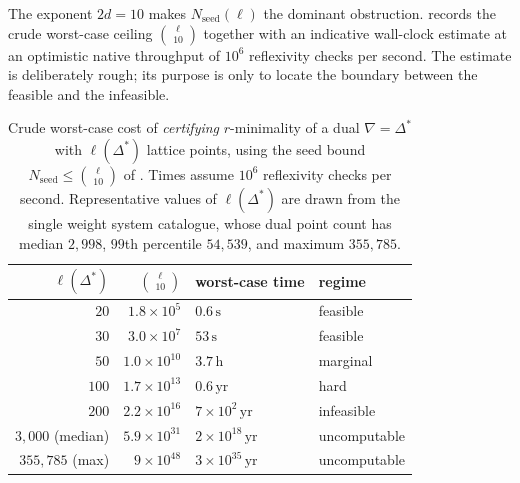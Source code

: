 \documentclass[appliedmath,article,submit,moreauthors]{Definitions/mdpi}
\begin{document}
The exponent \(2d=10\) makes \(N_{\mathrm{seed}}(\ell)\) the dominant
obstruction.  records the crude worst-case ceiling
\(\binom{\ell}{10}\) together with an indicative wall-clock estimate at an
optimistic native throughput of \(10^{6}\) reflexivity checks per second. The
estimate is deliberately rough; its purpose is only to locate the boundary
between the feasible and the infeasible.

\begin{table}[H]
\caption{Crude worst-case cost of \emph{certifying} \(r\)-minimality of a dual
\(\nabla=\Delta^*\) with \(\ell(\Delta^*)\) lattice points, using the seed bound
\(N_{\mathrm{seed}}\leq\binom{\ell}{10}\) of . Times assume
\(10^{6}\) reflexivity checks per second. Representative values of
\(\ell(\Delta^*)\) are drawn from the single weight system catalogue, whose dual
point count has median \(2{,}998\), \(99\)th percentile \(54{,}539\), and
maximum \(355{,}785\).\label{tab:rmin-cost}}
\begin{tabularx}{\textwidth}{RRLL}
\toprule
\(\ell(\Delta^*)\) & \(\binom{\ell}{10}\) & \textbf{worst-case time} & \textbf{regime} \\
\midrule
\(20\)      & \(1.8\times10^{5}\)  & \(0.6\,\mathrm{s}\)              & feasible \\
\(30\)      & \(3.0\times10^{7}\)  & \(53\,\mathrm{s}\)              & feasible \\
\(50\)      & \(1.0\times10^{10}\) & \(3.7\,\mathrm{h}\)            & marginal \\
\(100\)     & \(1.7\times10^{13}\) & \(0.6\,\mathrm{yr}\)           & hard \\
\(200\)     & \(2.2\times10^{16}\) & \(7\times10^{2}\,\mathrm{yr}\) & infeasible \\
\(3{,}000\) (median) & \(5.9\times10^{31}\) & \(2\times10^{18}\,\mathrm{yr}\) &
  uncomputable \\
\(355{,}785\) (max)  & \(9\times10^{48}\)   & \(3\times10^{35}\,\mathrm{yr}\) &
  uncomputable \\
\bottomrule
\end{tabularx}
\end{table}
\end{document}
